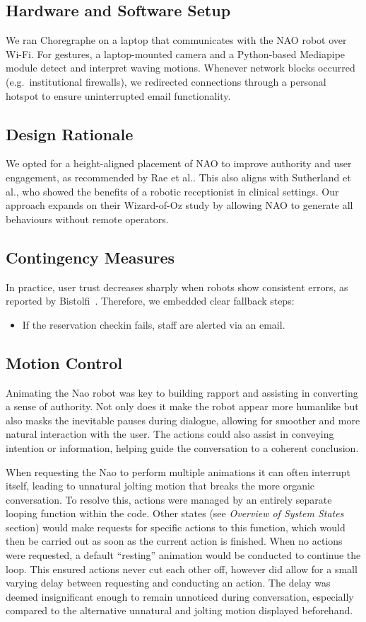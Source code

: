 \documentclass[conference]{IEEEtran}
\begin{document}
\subsection{Hardware and Software Setup} We ran Choregraphe on a laptop that communicates with the NAO robot over Wi-Fi.
For gestures, a laptop-mounted camera and a Python-based Mediapipe module detect and interpret waving motions.
Whenever network blocks occurred (e.g.\ institutional firewalls), we redirected connections through a personal hotspot to ensure uninterrupted email functionality.

\subsection{Design Rationale} We opted for a height-aligned placement of NAO to improve authority and user engagement,
as recommended by Rae et al.\cite{Rae2013}. This also aligns with Sutherland et al.\cite{Sutherland2019}, who showed the benefits of
a robotic receptionist in clinical settings. Our approach expands on their Wizard-of-Oz study by allowing NAO to generate all behaviours without remote operators.

\subsection{Contingency Measures} In practice, user trust decreases sharply when robots show consistent errors, as reported by Bistolfi~\cite{Bistolfi2022}.
Therefore, we embedded clear fallback steps:
\begin{itemize}
        \item If the reservation checkin fails, staff are alerted via an email.
\end{itemize}

\subsection{Motion Control}
Animating the Nao robot was key to building rapport and assisting in converting a sense of authority. Not only does it make the robot 
appear more humanlike but also masks the inevitable pauses during dialogue, allowing for smoother and more natural interaction with 
the user. The actions could also assist in conveying intention or information, helping guide the conversation to a coherent conclusion.

When requesting the Nao to perform multiple animations it can often interrupt itself, leading to unnatural jolting motion that breaks 
the more organic conversation. To resolve this, actions were managed by an entirely separate looping function within the code. Other 
states (see \textit{Overview of System States} section) would make requests for specific actions to this function, which would then be carried out as soon as the 
current action is finished. When no actions were requested, a default “resting” animation would be conducted to continue the loop. 
This ensured actions never cut each other off, however did allow for a small varying delay between requesting and conducting an action. 
The delay was deemed insignificant enough to remain unnoticed during conversation, especially compared to the alternative unnatural and 
jolting motion displayed beforehand.
\end{document}
